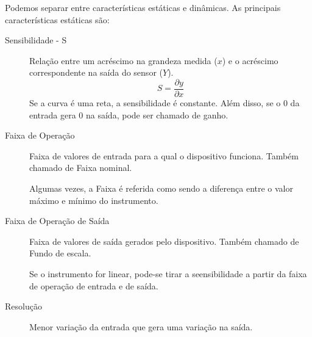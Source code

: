 Podemos separar entre características estáticas e dinâmicas. As principais características estáticas são:
\begin{description}
  \item[Sensibilidade - S] Relação entre um acréscimo na grandeza medida ($x$) e o acréscimo correspondente na saída do sensor ($Y$).
  \[
S = \frac{\partial y}{\partial x}
  \]
Se a curva é uma reta, a sensibilidade é constante. Além disso, se o 0 da entrada gera 0 na saída, pode ser chamado de ganho.
\item[Faixa de Operação] Faixa de valores de entrada para a qual o dispositivo funciona. Também chamado de Faixa nominal.

Algumas vezes, a Faixa é referida como sendo a diferença entre o valor máximo e mínimo do instrumento.
\item[Faixa de Operação de Saída] Faixa de valores de saída gerados pelo dispositivo. Também chamado de Fundo de escala.

Se o instrumento for linear, pode-se tirar a seensibilidade a partir da faixa de operação de entrada e de saída.
\item[Resolução] Menor variação da entrada que gera uma variação na saída.


\end{description}
